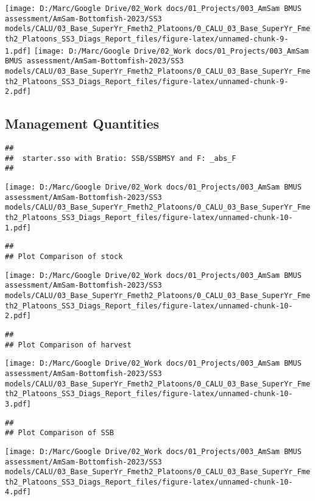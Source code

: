 \documentclass[
]{article}
\begin{document}
\texttt{[image: D:/Marc/Google Drive/02\_Work docs/01\_Projects/003\_AmSam BMUS assessment/AmSam-Bottomfish-2023/SS3 models/CALU/03\_Base\_SuperYr\_Fmeth2\_Platoons/0\_CALU\_03\_Base\_SuperYr\_Fmeth2\_Platoons\_SS3\_Diags\_Report\_files/figure-latex/unnamed-chunk-9-1.pdf]}
\texttt{[image: D:/Marc/Google Drive/02\_Work docs/01\_Projects/003\_AmSam BMUS assessment/AmSam-Bottomfish-2023/SS3 models/CALU/03\_Base\_SuperYr\_Fmeth2\_Platoons/0\_CALU\_03\_Base\_SuperYr\_Fmeth2\_Platoons\_SS3\_Diags\_Report\_files/figure-latex/unnamed-chunk-9-2.pdf]}

\hypertarget{management-quantities}{%
\subsection{Management Quantities}\label{management-quantities}}

\begin{verbatim}
## 
##  starter.sso with Bratio: SSB/SSBMSY and F: _abs_F 
## 
\end{verbatim}

\texttt{[image: D:/Marc/Google Drive/02\_Work docs/01\_Projects/003\_AmSam BMUS assessment/AmSam-Bottomfish-2023/SS3 models/CALU/03\_Base\_SuperYr\_Fmeth2\_Platoons/0\_CALU\_03\_Base\_SuperYr\_Fmeth2\_Platoons\_SS3\_Diags\_Report\_files/figure-latex/unnamed-chunk-10-1.pdf]}

\begin{verbatim}
## 
## Plot Comparison of stock
\end{verbatim}

\texttt{[image: D:/Marc/Google Drive/02\_Work docs/01\_Projects/003\_AmSam BMUS assessment/AmSam-Bottomfish-2023/SS3 models/CALU/03\_Base\_SuperYr\_Fmeth2\_Platoons/0\_CALU\_03\_Base\_SuperYr\_Fmeth2\_Platoons\_SS3\_Diags\_Report\_files/figure-latex/unnamed-chunk-10-2.pdf]}

\begin{verbatim}
## 
## Plot Comparison of harvest
\end{verbatim}

\texttt{[image: D:/Marc/Google Drive/02\_Work docs/01\_Projects/003\_AmSam BMUS assessment/AmSam-Bottomfish-2023/SS3 models/CALU/03\_Base\_SuperYr\_Fmeth2\_Platoons/0\_CALU\_03\_Base\_SuperYr\_Fmeth2\_Platoons\_SS3\_Diags\_Report\_files/figure-latex/unnamed-chunk-10-3.pdf]}

\begin{verbatim}
## 
## Plot Comparison of SSB
\end{verbatim}

\texttt{[image: D:/Marc/Google Drive/02\_Work docs/01\_Projects/003\_AmSam BMUS assessment/AmSam-Bottomfish-2023/SS3 models/CALU/03\_Base\_SuperYr\_Fmeth2\_Platoons/0\_CALU\_03\_Base\_SuperYr\_Fmeth2\_Platoons\_SS3\_Diags\_Report\_files/figure-latex/unnamed-chunk-10-4.pdf]}
\end{document}
